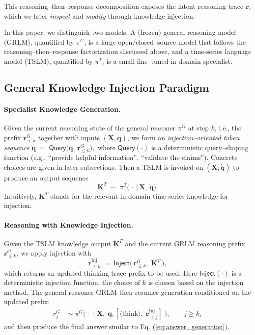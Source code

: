 \documentclass[twoside]{article}
\begin{document}
This reasoning–then–response decomposition exposes the latent reasoning trace \(\mathbf{r}\), which we later \emph{inspect} and \emph{modify} through knowledge injection.

In this paper, we distinguish two models. A (frozen) general reasoning model (GRLM), quantified by \(\pi^{G}\), is a large open/closed–source model that follows the reasoning–then–response factorization discussed above, and a time-series language model (TSLM), quantified by \(\pi^{T}\), is a small fine–tuned in-domain specialist. 

\subsection{General Knowledge Injection Paradigm}
\label{method:paradigm}


\paragraph{Specialist Knowledge Generation.} Given the current reasoning state of the general reasoner \(\pi^{G}\) at step \(k\), i.e., the prefix \(\mathbf{r}^{G}_{<k}\) together with inputs \((\mathbf{X},\mathbf{q})\), we form an \emph{injection–oriented token sequence}
\(
\mathbf{\tilde{q}} \;=\; \mathsf{Query} \!\big(\mathbf{q},\, \mathbf{r}^{G}_{\le k}\big),
\)
where \(\mathsf{Query}(\cdot)\) is a deterministic query–shaping function (e.g., “provide helpful information”, “validate the claims”). Concrete choices are given in later subsections. Then a TSLM is invoked on \((\mathbf{X},\mathbf{\tilde{q}})\) to produce an output sequence
\[
\mathbf{K}^{T} \;\sim\; \pi^{T}\big(\,\cdot \,\big|\, \mathbf{X},\, \mathbf{\tilde{q}}\big).
\]
Intuitively, $\mathbf{K}^{T}$ stands for the relevant in-domain time-series knowledge for injection.

\paragraph{Reasoning with Knowledge Injection.}
Given the TSLM knowledge output \(\mathbf{K}^{T}\) and the current GRLM reasoning prefix \(\mathbf{r}^{G}_{\le k}\), we apply injection with 
\[
\mathbf{r}^{\text{Inj}}_{\le k}\;=\;\mathsf{Inject} \big(\,\mathbf{r}^{G}_{\le k},\;\mathbf{K}^{T}\, \big),
\]
which returns an updated thinking trace prefix to be used. Here \(\mathsf{Inject}(\cdot)\) is a deterministic injection function; the choice of \(k\) is chosen based on the injection method. The general reasoner GRLM then resumes generation conditioned on the updated prefix:
\begin{align}
\label{eq:GRLM}
r^{G}_{j} \;&\sim\; \pi^{G}\!\Big(\,\cdot \;\Big|\;  \mathbf{X},\; \mathbf{q},[\langle\mathrm{think}\rangle,\; \mathbf{r}^{\text{Inj}}_{<j}]\;\Big),
\qquad j \ge k,
\end{align}
and then produce the final answer similar to Eq. (\ref{eq:answer_generation}).
\end{document}

